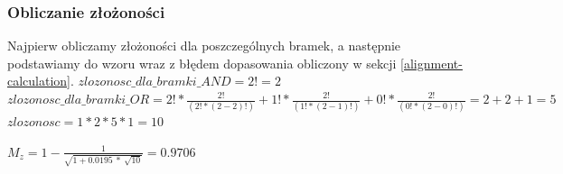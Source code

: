 \subsubsection{Obliczanie złożoności}
Najpierw obliczamy złożoności dla poszczególnych bramek, a następnie podstawiamy do wzoru wraz z błędem dopasowania obliczony w sekcji \ref{alignment-calculation}.\newline
$zlozonosc\_dla\_bramki\_AND = 2! = 2$\newline
$zlozonosc\_dla\_bramki\_OR = 2! * \frac{2!}{(2! * (2 - 2)!)} + 1! *  \frac{2!}{(1! * (2 - 1)!)} + 0! * \frac{2!}{(0! * (2 - 0)!)} = 2 + 2 + 1 = 5$\newline
$zlozonosc = 1 * 2 * 5 * 1 = 10$
\begin{center}
$M_z = 1 - \frac{1}{\sqrt{1 + 0.0195\ *\ \sqrt{10}}} = 0.9706$
\end{center}